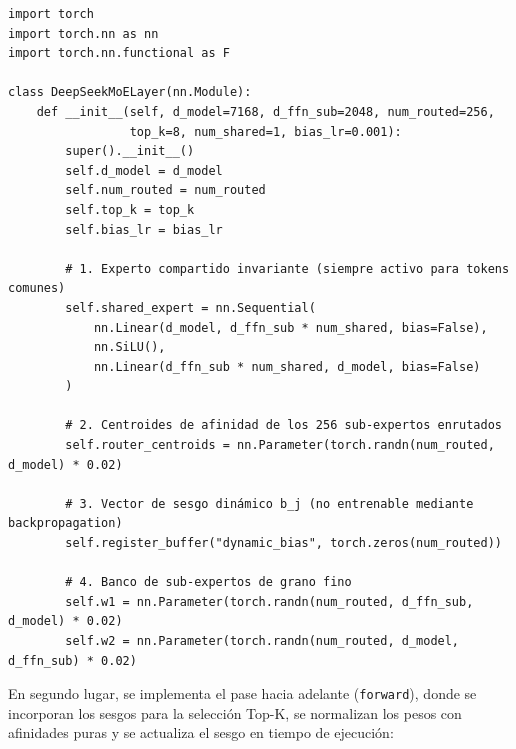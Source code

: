 \begin{tcolorbox}[colback=bg_marfil, colframe=unmsm_gold, arc=3pt, boxrule=0.6pt, top=0.2cm, bottom=0.2cm, left=0.4cm, right=0.4cm]
\scriptsize\ttfamily
\begin{verbatim}
import torch
import torch.nn as nn
import torch.nn.functional as F

class DeepSeekMoELayer(nn.Module):
    def __init__(self, d_model=7168, d_ffn_sub=2048, num_routed=256, 
                 top_k=8, num_shared=1, bias_lr=0.001):
        super().__init__()
        self.d_model = d_model
        self.num_routed = num_routed
        self.top_k = top_k
        self.bias_lr = bias_lr
        
        # 1. Experto compartido invariante (siempre activo para tokens comunes)
        self.shared_expert = nn.Sequential(
            nn.Linear(d_model, d_ffn_sub * num_shared, bias=False),
            nn.SiLU(),
            nn.Linear(d_ffn_sub * num_shared, d_model, bias=False)
        )
        
        # 2. Centroides de afinidad de los 256 sub-expertos enrutados
        self.router_centroids = nn.Parameter(torch.randn(num_routed, d_model) * 0.02)
        
        # 3. Vector de sesgo dinámico b_j (no entrenable mediante backpropagation)
        self.register_buffer("dynamic_bias", torch.zeros(num_routed))
        
        # 4. Banco de sub-expertos de grano fino
        self.w1 = nn.Parameter(torch.randn(num_routed, d_ffn_sub, d_model) * 0.02)
        self.w2 = nn.Parameter(torch.randn(num_routed, d_model, d_ffn_sub) * 0.02)
\end{verbatim}
\end{tcolorbox}

En segundo lugar, se implementa el pase hacia adelante (\texttt{forward}), donde se incorporan los sesgos para la selección Top-K, se normalizan los pesos con afinidades puras y se actualiza el sesgo en tiempo de ejecución:

